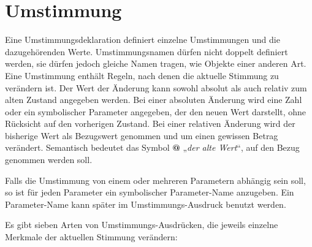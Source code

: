 


\chapter{Umstimmung}\label{cha:umstimmung}
Eine Umstimmungsdeklaration definiert einzelne Umstimmungen und die
dazugehörenden Werte. Umstimmungsnamen dürfen nicht doppelt definiert
werden, sie dürfen jedoch gleiche Namen tragen,
wie Objekte einer anderen Art.
Eine Umstimmung enthält Regeln, nach denen die aktuelle Stimmung
 zu
verändern ist. Der Wert der Änderung kann sowohl absolut als auch
relativ zum alten Zustand angegeben werden. Bei einer absoluten Änderung
wird eine Zahl oder ein symbolischer Parameter angegeben, der den
neuen Wert darstellt, ohne Rücksicht auf den vorherigen Zustand.
Bei einer relativen Änderung wird der bisherige Wert als Bezugswert
genommen und um einen gewissen Betrag verändert. Semantisch bedeutet das
Symbol \textbf{@} „\emph{der alte Wert}“,
auf den Bezug genommen werden soll.

Falls die Umstimmung von einem oder mehreren Parametern
 abhängig sein soll,
so ist für jeden Parameter
 ein symbolischer Parameter-Name anzugeben.
Ein Parameter-Name kann später im Umstimmungs-Ausdruck benutzt werden.




Es gibt sieben Arten von Umstimmungs-Ausdrücken, die jeweils einzelne
Merkmale der aktuellen Stimmung ver\-än\-dern:



